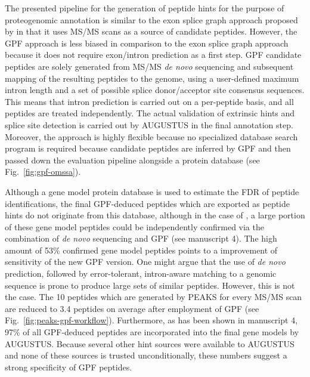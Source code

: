 The presented pipeline for the generation of peptide hints for the purpose of
proteogenomic annotation is similar to the exon splice graph approach proposed
by \citeauthor{Tanner2007} in that it uses MS/MS scans as a source of candidate
peptides.
However, the GPF approach is less biased in comparison to the exon splice graph
approach because it does not require exon/intron prediction as a first step.
GPF candidate peptides are solely generated from MS/MS {\em de novo} sequencing
and subsequent mapping of the resulting peptides to the genome, using a 
user-defined maximum intron length and a set of possible splice donor/acceptor 
site consensus sequences.
This means that intron prediction is carried out on a per-peptide basis, and
all peptides are treated independently.
The actual validation of extrinsic hints and splice site detection is
carried out by AUGUSTUS in the final annotation step.
Moreover, the approach is highly flexible because no specialized database
search program is required because candidate peptides are inferred by GPF
and then passed down the evaluation pipeline alongside a protein database
(see Fig.~\ref{fig:gpf-omssa}).


Although a gene model protein database is used to estimate the FDR of peptide 
identifications, the final GPF-deduced peptides which are exported as
peptide hints do not originate from this database, although in the case
of \cre, a large portion of these gene model peptides could be 
independently confirmed via the combination of {\em de novo} sequencing and 
GPF (see manuscript 4).
The high amount of 53\% confirmed gene model peptides points to a improvement 
of sensitivity of the new GPF version.
One might argue that the use of {\em de novo} prediction, followed by
error-tolerant, intron-aware matching to a genomic sequence is prone to
produce large sets of similar peptides.
However, this is not the case.
The 10 peptides which are generated by PEAKS for every MS/MS scan are 
reduced to 3.4 peptides on average after employment of GPF 
(see Fig.~\ref{fig:peaks-gpf-workflow}).
Furthermore, as has been shown in manuscript 4, 97\% of all GPF-deduced 
peptides are incorporated into the final gene models by AUGUSTUS.
Because several other hint sources were available to AUGUSTUS and none of
these sources is trusted unconditionally, these numbers suggest a strong 
specificity of GPF peptides.

